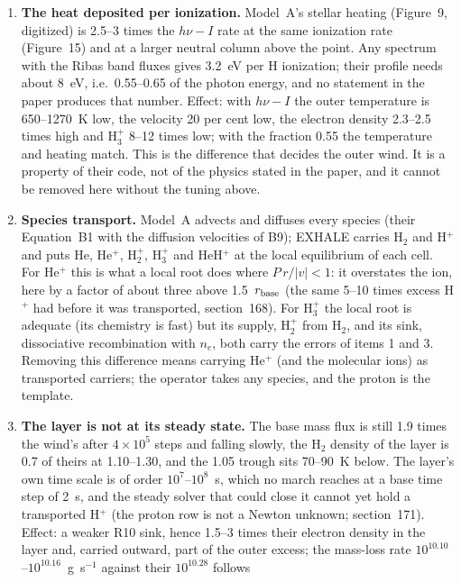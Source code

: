 \documentclass[english,a4paper]{my_memo}
\begin{document}
\begin{enumerate}
\item \textbf{The heat deposited per ionization.} Model~A's stellar heating
  (Figure~9, digitized) is 2.5--3 times the $h\nu - I$ rate at the same
  ionization rate (Figure~15) and at a larger neutral column above the
  point. Any spectrum with the Ribas band fluxes gives 3.2~eV per H
  ionization; their profile needs about 8~eV, i.e.\ 0.55--0.65 of the photon
  energy, and no statement in the paper produces that number. Effect: with
  $h\nu - I$ the outer temperature is 650--1270~K low, the velocity 20 per
  cent low, the electron density 2.3--2.5 times high and H$_3^+$ 8--12 times
  low; with the fraction 0.55 the temperature and heating match. This is
  the difference that decides the outer wind. It is a property of their
  code, not of the physics stated in the paper, and it cannot be removed
  here without the tuning above.
\item \textbf{Species transport.} Model~A advects and diffuses every species
  (their Equation~B1 with the diffusion velocities of B9); EXHALE carries
  H$_2$ and H$^+$ and puts He, He$^+$, H$_2^+$, H$_3^+$ and HeH$^+$ at the
  local equilibrium of each cell. For He$^+$ this is what a local root
  does where $P\,r/|v| < 1$: it overstates the ion, here by a factor of
  about three above 1.5~$r_{\rm base}$ (the same 5--10 times excess H$^+$
  had before it was transported, section~168). For H$_3^+$ the local root is
  adequate (its chemistry is fast) but its supply, H$_2^+$ from H$_2$, and
  its sink, dissociative recombination with $n_e$, both carry the errors of
  items 1 and 3. Removing this difference means carrying He$^+$ (and the
  molecular ions) as transported carriers; the operator takes any species,
  and the proton is the template.
\item \textbf{The layer is not at its steady state.} The base mass flux is
  still 1.9 times the wind's after $4\times10^5$ steps and falling slowly,
  the H$_2$ density of the layer is 0.7 of theirs at 1.10--1.30, and the
  1.05 trough sits 70--90~K below. The layer's own time scale is of order
  $10^7$--$10^8$~s, which no march reaches at a base time step of 2~s, and
  the steady solver that could close it cannot yet hold a transported
  H$^+$ (the proton row is not a Newton unknown; section~171). Effect: a
  weaker R10 sink, hence 1.5--3 times their electron density in the layer
  and, carried outward, part of the outer excess; the mass-loss rate
  $10^{10.10}$--$10^{10.16}$~g~s$^{-1}$ against their $10^{10.28}$ follows

\end{enumerate}
\end{document}
